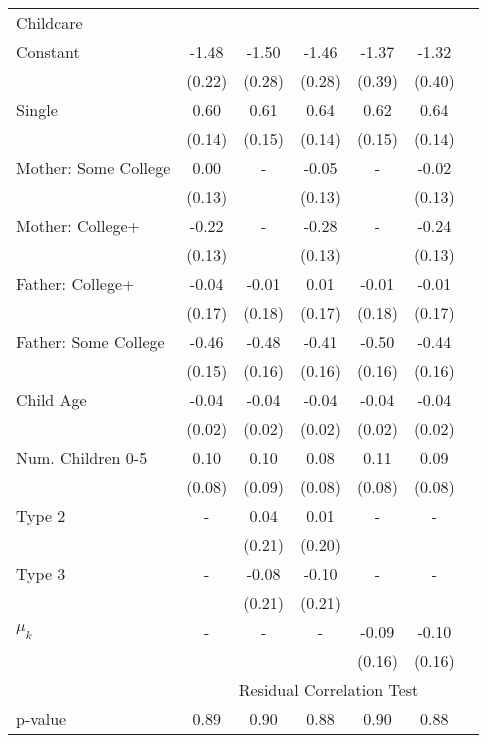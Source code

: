 \begin{tabular}{lcccccc}
Childcare}\\\cmidrule(r){2-7}Constant&-1.48&-1.50&-1.46&-1.37&-1.32&\\&(0.22)&(0.28)&(0.28)&(0.39)&(0.40)&\\Single&0.60&0.61&0.64&0.62&0.64&\\&(0.14)&(0.15)&(0.14)&(0.15)&(0.14)&\\Mother: Some College&0.00&-&-0.05&-&-0.02&\\&(0.13)&&(0.13)&&(0.13)&\\Mother: College+&-0.22&-&-0.28&-&-0.24&\\&(0.13)&&(0.13)&&(0.13)&\\Father: College+&-0.04&-0.01&0.01&-0.01&-0.01&\\&(0.17)&(0.18)&(0.17)&(0.18)&(0.17)&\\Father: Some College&-0.46&-0.48&-0.41&-0.50&-0.44&\\&(0.15)&(0.16)&(0.16)&(0.16)&(0.16)&\\Child Age&-0.04&-0.04&-0.04&-0.04&-0.04&\\&(0.02)&(0.02)&(0.02)&(0.02)&(0.02)&\\Num. Children 0-5&0.10&0.10&0.08&0.11&0.09&\\&(0.08)&(0.09)&(0.08)&(0.08)&(0.08)&\\Type 2&-&0.04&0.01&-&-&\\&&(0.21)&(0.20)&&&\\Type 3&-&-0.08&-0.10&-&-&\\&&(0.21)&(0.21)&&&\\$\mu_{k}$&-&-&-&-0.09&-0.10&\\&&&&(0.16)&(0.16)&\\& \multicolumn{6}{c}{Residual Correlation Test}\\\cmidrule(r){2-7}p-value&0.89&0.90&0.88&0.90&0.88&\\
\bottomrule\end{tabular}